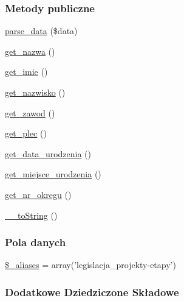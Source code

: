 \subsubsection*{Metody publiczne}
\begin{DoxyCompactItemize}
\item 
\hyperlink{classep___legislacja___projekt___etap_ac313783ab7146c71e639bf7ddf54b0db}{parse\-\_\-data} (\$data)
\item 
\hyperlink{classep___legislacja___projekt___etap_ac0818f0049d7b84f08f77128f54cee36}{get\-\_\-nazwa} ()
\item 
\hyperlink{classep___legislacja___projekt___etap_ac4b0c85dc2a130038f2d118dbd0c3d77}{get\-\_\-imie} ()
\item 
\hyperlink{classep___legislacja___projekt___etap_abdd1d7ff92508da7f748ba1feec97af0}{get\-\_\-nazwisko} ()
\item 
\hyperlink{classep___legislacja___projekt___etap_af80ca8310b60004454dd02a387deaa2c}{get\-\_\-zawod} ()
\item 
\hyperlink{classep___legislacja___projekt___etap_ac7f9af5c3fa024e4c26a7b6bd4ce4bb4}{get\-\_\-plec} ()
\item 
\hyperlink{classep___legislacja___projekt___etap_a880b240cd2d8c336fd1709bf0cb1ae2c}{get\-\_\-data\-\_\-urodzenia} ()
\item 
\hyperlink{classep___legislacja___projekt___etap_ac57c08ec5e394a19c5bd9280c8376182}{get\-\_\-miejsce\-\_\-urodzenia} ()
\item 
\hyperlink{classep___legislacja___projekt___etap_a2645a9f0aa5b0ccc482943348c033d0a}{get\-\_\-nr\-\_\-okregu} ()
\item 
\hyperlink{classep___legislacja___projekt___etap_a7516ca30af0db3cdbf9a7739b48ce91d}{\-\_\-\-\_\-to\-String} ()
\end{DoxyCompactItemize}
\subsubsection*{Pola danych}
\begin{DoxyCompactItemize}
\item 
\hyperlink{classep___legislacja___projekt___etap_ab4e31d75f0bc5d512456911e5d01366b}{\$\-\_\-aliases} = array('legislacja\-\_\-projekty-\/etapy')
\end{DoxyCompactItemize}
\subsubsection*{Dodatkowe Dziedziczone Składowe}


